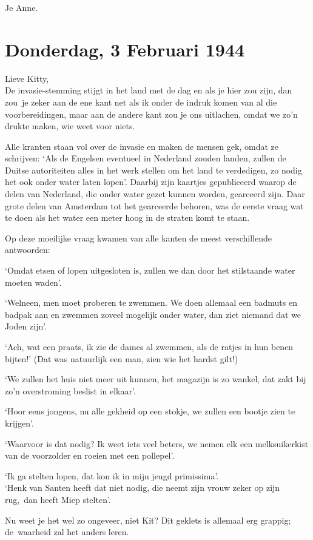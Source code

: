 \documentclass{book}
\begin{document}
Je Anne.

\chapter{Donderdag, 3 Februari 1944}

Lieve Kitty,\\De invasie-stemming stijgt in het land met de dag en als
je hier zou zijn, dan zou~je zeker aan de ene kant net als ik onder de
indruk komen van al die voorbereidingen, maar aan de andere kant zou je
ons uitlachen, omdat we zo'n drukte maken, wie weet voor niets.

Alle kranten staan vol over de invasie en maken de mensen gek, omdat ze
schrijven: `Als de Engelsen eventueel in Nederland zouden landen, zullen
de Duitse autoriteiten alles in het werk stellen om het land te
verdedigen, zo nodig het ook onder water laten lopen'. Daarbij zijn
kaartjes gepubliceerd waarop de delen van Nederland, die onder water
gezet kunnen worden, gearceerd zijn. Daar grote delen van Amsterdam tot
het gearceerde behoren, was de eerste vraag wat te doen als het water
een meter hoog in de straten komt te staan.

Op deze moeilijke vraag kwamen van alle kanten de meest verschillende
antwoorden:

`Omdat etsen of lopen uitgesloten is, zullen we dan door het stilstaande
water moeten waden'.

`Welneen, men moet proberen te zwemmen. We doen allemaal een badmuts en
badpak aan en zwemmen zoveel mogelijk onder water, dan ziet niemand dat
we Joden zijn'.

`Ach, wat een praats, ik zie de dames al zwemmen, als de ratjes in hun
benen bijten!' (Dat was natuurlijk een man, zien wie het hardst gilt!)

`We zullen het huis niet meer uit kunnen, het magazijn is zo wankel, dat
zakt bij zo'n overstroming beslist in elkaar'.

`Hoor eens jongens, nu alle gekheid op een stokje, we zullen een bootje
zien te krijgen'.

`Waarvoor is dat nodig? Ik weet iets veel beters, we nemen elk een
melksuikerkist van de voorzolder en roeien met een pollepel'.

`Ik ga stelten lopen, dat kon ik in mijn jeugd primissima'.\\`Henk van
Santen heeft dat niet nodig, die neemt zijn vrouw zeker op zijn rug,~dan
heeft Miep stelten'.

Nu weet je het wel zo ongeveer, niet Kit? Dit geklets is allemaal erg
grappig; de~waarheid zal het anders leren.
\end{document}

